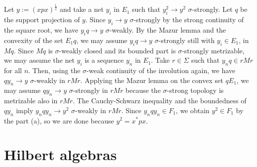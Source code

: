 \documentclass{../../large}
\begin{document}
\begin{pf}
Let $y:=(xpx)^{\frac12}$ and take a net $y_i$ in $E_1$ such that $y_i^2\to y^2$ $\sigma$-strongly.
Let $q$ be the support projection of $y$.
Since $y_i\to y$ $\sigma$-strongly by the strong continuity of the square root, we have $y_iq\to y$ $\sigma$-weakly.
By the Mazur lemma and the convexity of the set $E_1q$, we may assume $y_iq\to y$ $\sigma$-strongly still with $y_i\in E_1$, in $Mq$.
Since $Mq$ is $\sigma$-weakly closed and its bounded part is $\sigma$-strongly metrizable, we may assume the net $y_i$ is a sequence $y_n$ in $E_1$.
Take $r\in\Sigma$ such that $y_nq\in rMr$ for all $n$.
Then, using the $\sigma$-weak continuity of the involution again, we have $qy_n\to y$ $\sigma$-weakly in $rMr$.
Applying the Mazur lemma on the convex set $qE_1$, we may assume $qy_n\to y$ $\sigma$-strongly in $rMr$ because the $\sigma$-strong topology is metrizable also in $rMr$.
The Cauchy-Schwarz inequality and the boundedness of $qy_n$ imply $y_nqy_n\to y^2$ $\sigma$-weakly in $rMr$.
Since $y_nqy_n\in F_1$, we obtain $y^2\in F_1$ by the part (a), so we are done because $y^2=x^*px$.
\end{pf}

\section{Hilbert algebras}
\end{document}
